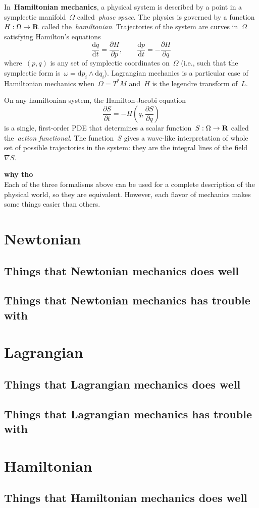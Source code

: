 In~{\bf Hamiltonian mechanics}, a physical system is described by a point in
a symplectic manifold~$\Omega$ called~\emph{phase space}.  The physics is
governed by a function~$H:\Omega\to\mathbf{R}$ called the~\emph{hamiltonian}.
Trajectories of the system are curves in~$\Omega$ satisfying Hamilton's
equations
\[
	\frac{\mathrm{d}q}{\mathrm{d}t}=\frac{\partial H}{\partial p},
	\qquad
	\frac{\mathrm{d}p}{\mathrm{d}t}=-\frac{\partial H}{\partial q}
\]
where~$(p,q)$ is any set of symplectic coordinates on~$\Omega$ (i.e., such
that the symplectic form is~$\omega=\mathrm{d}p_i\wedge\mathrm{d}q_i$).
Lagrangian mechanics is a particular case of Hamiltonian mechanics
when~$\Omega=T^*M$ and~$H$ is the legendre transform of~$L$.

On any hamiltonian system, the Hamilton-Jacobi equation
\[
	\frac{\partial S}{\partial t}
	=
	-H\left(q, \frac{\partial S}{\partial q}\right)
\]
is a single, first-order PDE that determines a scalar
function~$S:\Omega\to\mathbf{R}$ called the~\emph{action functional}.  The
function~$S$ gives a wave-like interpretation of whole set of possible
trajectories in the system: they are the integral lines of the field~$\nabla
S$.



{\bf why tho}\\
Each of the three formalisms above can be used for a complete description of
the physical world, so they are equivalent.  However, each flavor of
mechanics makes some things easier than others.

\section{Newtonian}

\subsection{Things that Newtonian mechanics does well}

\subsection{Things that Newtonian mechanics has trouble with}

\section{Lagrangian}

\subsection{Things that Lagrangian mechanics does well}

\subsection{Things that Lagrangian mechanics has trouble with}


\section{Hamiltonian}

\subsection{Things that Hamiltonian mechanics does well}

